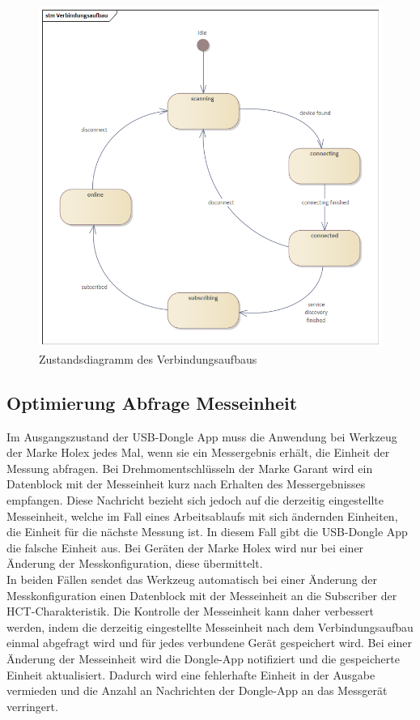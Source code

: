 \begin{figure}[H] 
	\centering
	\includegraphics[width=\textwidth]{figures/Verbindungsaufbau.png}
	\caption{Zustandsdiagramm des Verbindungsaufbaus}
\end{figure}



\subsection{Optimierung Abfrage Messeinheit} 
Im Ausgangszustand der \ac{USB}-Dongle App muss die Anwendung bei Werkzeug der Marke Holex jedes Mal, wenn sie ein Messergebnis erhält, die Einheit der Messung abfragen. Bei Drehmomentschlüsseln der Marke Garant wird ein Datenblock mit der Messeinheit kurz nach Erhalten des Messergebnisses empfangen. Diese Nachricht bezieht sich jedoch auf die derzeitig eingestellte Messeinheit, welche im Fall eines Arbeitsablaufs mit sich ändernden Einheiten, die Einheit für die nächste Messung ist. In diesem Fall gibt die \ac{USB}-Dongle App die falsche Einheit aus. Bei Geräten der Marke Holex wird nur bei einer Änderung der Messkonfiguration, diese übermittelt.\\
In beiden Fällen sendet das Werkzeug automatisch bei einer Änderung der Messkonfiguration einen Datenblock mit der Messeinheit an die Subscriber der \ac{HCT}-Charakteristik. Die Kontrolle der Messeinheit kann daher verbessert werden, indem die derzeitig eingestellte Messeinheit nach dem Verbindungsaufbau einmal abgefragt wird und für jedes verbundene Gerät gespeichert wird. Bei einer Änderung der Messeinheit wird die Dongle-App notifiziert und die gespeicherte Einheit aktualisiert. Dadurch wird eine fehlerhafte Einheit in der Ausgabe vermieden und die Anzahl an Nachrichten der Dongle-App an das Messgerät verringert.

